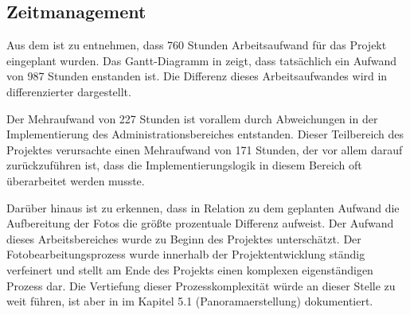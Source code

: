 \subsection{Zeitmanagement}
\label{sec:Zeitmanagement}

Aus dem  ist zu entnehmen, dass 760 Stunden Arbeitsaufwand für das Projekt
eingeplant wurden. Das Gantt-Diagramm in  zeigt, dass
tatsächlich ein Aufwand von 987 Stunden enstanden ist.
Die Differenz dieses Arbeitsaufwandes wird in  differenzierter dargestellt.



Der Mehraufwand von 227 Stunden ist vorallem durch Abweichungen in der Implementierung des Administrationsbereiches
entstanden. Dieser Teilbereich des Projektes verursachte einen Mehraufwand von
171 Stunden, der vor allem darauf zurückzuführen ist, dass die Implementierungslogik in diesem Bereich oft überarbeitet werden musste.

Darüber hinaus ist zu erkennen, dass in Relation zu dem geplanten Aufwand die Aufbereitung der Fotos die größte
prozentuale Differenz aufweist. Der Aufwand dieses Arbeitsbereiches wurde zu Beginn des Projektes unterschätzt.
Der Fotobearbeitungsprozess wurde innerhalb der Projektentwicklung ständig verfeinert und stellt am Ende des Projekts
einen komplexen eigenständigen Prozess dar. Die Vertiefung dieser Prozesskomplexität würde an dieser Stelle zu weit
führen, ist aber in \citet{modelierungUndBetrieb2014} im Kapitel 5.1 (Panoramaerstellung) dokumentiert.